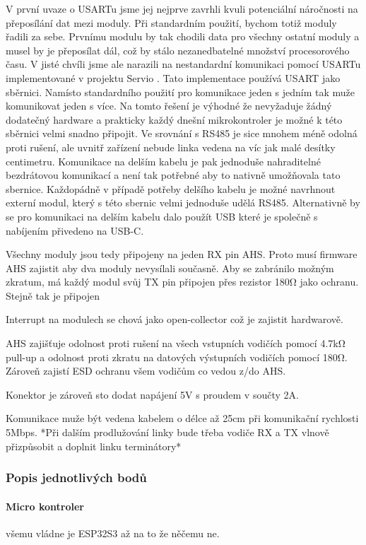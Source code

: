V první uvaze o USARTu jsme jej nejprve zavrhli kvuli potenciální náročnosti na přeposílání dat mezi moduly.
Při standardním použití, bychom totiž moduly řadili za sebe.
Prvnímu modulu by tak chodili data pro všechny ostatní moduly a musel by je přeposílat dál, což by stálo nezanedbatelné množství procesorového času.
V jisté chvíli jsme ale narazili na nestandardní komunikaci pomocí USARTu implementované v projektu Servio \cite{Servio}.
Tato implementace používá USART jako sběrnici.
Namísto standardního použití pro komunikace jeden s jedním tak muže komunikovat jeden s více.
Na tomto řešení je výhodné že nevyžaduje žádný dodatečný hardware a prakticky každý dnešní mikrokontroler je možné k této sběrnici velmi snadno připojit.
Ve srovnání s RS485 je sice mnohem méně odolná proti rušení, ale uvnitř zařízení nebude linka vedena na víc jak malé desítky centimetru.
Komunikace na delším kabelu je pak jednoduše nahraditelné bezdrátovou komunikací a není tak potřebné aby to nativně umožňovala tato sbernice.
Každopádně v případě potřeby delšího kabelu je možné navrhnout externí modul, který s této sbernic velmi jednoduše udělá RS485.
Alternativně by se pro komunikaci na delším kabelu dalo použít USB které je společně s nabíjením přivedeno na USB-C.

Všechny moduly jsou tedy připojeny na jeden RX pin AHS.
Proto musí firmware AHS zajistit aby dva moduly nevysílali současně.
Aby se zabránilo možným zkratum, má každý modul svůj TX pin připojen přes rezistor 180Ω jako ochranu.
Stejně tak je připojen 

Interrupt na modulech se chová jako open-collector což je zajistit hardwarově.

AHS zajišťuje odolnost proti rušení na všech vstupních vodičích pomocí 4.7kΩ pull-up a odolnost proti zkratu na datových výstupních vodičích pomocí 180Ω.
Zároveň zajistí ESD ochranu všem vodičům co vedou z/do AHS.

Konektor je zároveň sto dodat napájení 5V s proudem v součty 2A.

Komunikace muže být vedena kabelem o délce až 25cm při komunikační rychlosti 5Mbps.
*Při dalším prodlužování linky bude třeba vodiče RX a TX vlnově přizpůsobit a doplnit linku terminátory*


\subsubsection{Popis jednotlivých bodů}
\paragraph{Micro kontroler}
všemu vládne je ESP32S3 \cite{ESP32S3-WR} až na to že něčemu ne.

